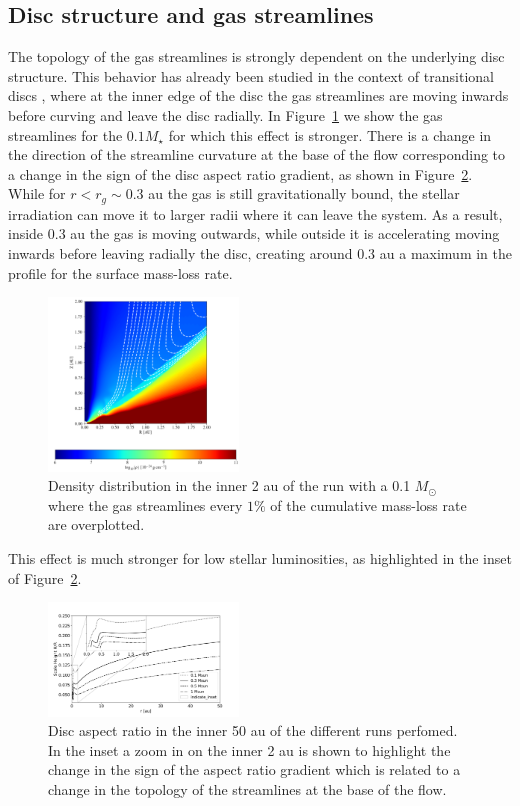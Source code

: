 \documentclass{aa}
\begin{document}
\subsection{Disc structure and gas streamlines}\label{sec:streamlines}
The topology of the gas streamlines is strongly dependent on the underlying disc structure. This behavior has already been studied in the context of transitional discs , where at the inner edge of the disc the gas streamlines are moving inwards before curving and leave the disc radially.
In Figure~\ref{fig:streamlines} we show the gas streamlines for the $0.1 M_\star$ for which this effect is stronger. There is a change in the direction of the streamline curvature at the base of the flow corresponding to a change in the sign of the disc aspect ratio gradient, as shown in Figure~\ref{fig:hr}.
While for $r<r_g\sim 0.3$ au the gas is still gravitationally bound, the stellar irradiation can move it to larger radii where it can leave the system. As a result, inside $0.3$ au the gas is moving outwards, while outside it is accelerating moving inwards before leaving radially the disc, creating around $0.3$ au a maximum in the profile for the surface mass-loss rate.
\begin{figure}
    \centering
    \includegraphics[width=0.45\textwidth]{streamlines}
    \caption{Density distribution in the inner 2 au of the run with a 0.1 $M_\odot$ where the gas streamlines every $1\%$ of the cumulative mass-loss rate are overplotted. \label{fig:streamlines}}
\end{figure}
This effect is much stronger for low stellar luminosities, as highlighted in the inset of Figure~\ref{fig:hr}.
\begin{figure}
    \centering
    \includegraphics[width=0.45\textwidth]{HR_comp}
    \caption{Disc aspect ratio in the inner 50 au of the different runs perfomed. In the inset a zoom in on the inner 2 au is shown to highlight the change in the sign of the aspect ratio gradient which is related to a change in the topology of the streamlines at the base of the flow. \label{fig:hr}}
\end{figure}
\end{document}
